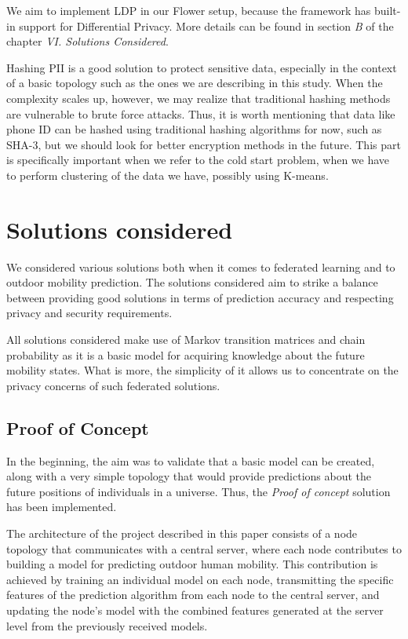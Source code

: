 \documentclass[conference]{IEEEtran}
\begin{document}
\begin{itemize}
    We aim to implement LDP in our Flower setup, because the framework has built-in support for Differential Privacy. More details can be found in section \textit{B} of the chapter \textit{VI. Solutions Considered}. \\
\end{itemize}

Hashing PII is a good solution to protect sensitive data, especially in the context of a basic topology such as the ones we are describing in this study. When the complexity scales up, however, we may realize that traditional hashing methods are vulnerable to brute force attacks. Thus, it is worth mentioning that data like phone ID can be hashed using traditional hashing algorithms for now, such as SHA-3, but we should look for better encryption methods in the future. This part is specifically important when we refer to the cold start problem, when we have to perform clustering of the data we have, possibly using K-means.

\section{Solutions considered}

We considered various solutions both when it comes to federated learning and to outdoor mobility prediction. The solutions considered aim to strike a balance between providing good solutions in terms of prediction accuracy and respecting privacy and security requirements.

All solutions considered make use of Markov transition matrices and chain probability as it is a basic model for acquiring knowledge about the future mobility states. What is more, the simplicity of it allows us to concentrate on the privacy concerns of such federated solutions.

\subsection{Proof of Concept}

In the beginning, the aim was to validate that a basic model can be created, along with a very simple topology that would provide predictions about the future positions of individuals in a universe. Thus, the \textit{Proof of concept} solution has been implemented.

The architecture of the project described in this paper consists of a node topology that communicates with a central server, where each node contributes to building a model for predicting outdoor human mobility. This contribution is achieved by training an individual model on each node, transmitting the specific features of the prediction algorithm from each node to the central server, and updating the node's model with the combined features generated at the server level from the previously received models.
\end{document}
